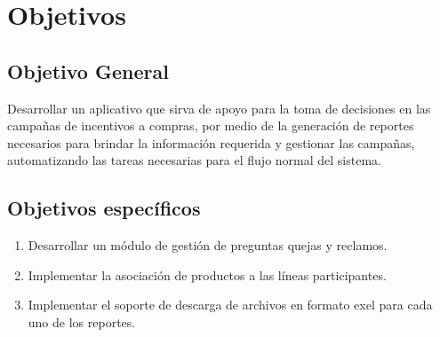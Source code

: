 \chapter{Objetivos}
\section{Objetivo General}
Desarrollar un aplicativo que sirva de apoyo para la toma de decisiones en las campa\~nas de incentivos a compras, por medio de la generaci\'on de reportes necesarios para brindar la informaci\'on requerida y gestionar las campa\~nas, automatizando las tareas necesarias para el flujo normal del sistema.%
\section{Objetivos espec\'ificos}
\begin{enumerate}
\item Desarrollar un m\'odulo de gesti\'on de preguntas quejas y reclamos.
\item Implementar la asociaci\'on de productos a las l\'ineas participantes.
\item Implementar el soporte de descarga de archivos en formato exel para cada uno de los reportes.
\end{enumerate}